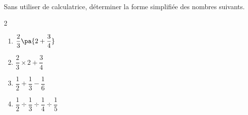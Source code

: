\begin{exo}{}
	Sans utiliser de calculatrice, déterminer la forme simplifiée des nombres suivants.
	\vspace*{-2mm}\begin{multicols}{2}
	\begin{enumerate}[itemsep=2mm]
		\item $\dfrac{2}{3}\pa{2 + \dfrac{3}{4}}$
		\item $\dfrac{2}{3} \times 2 + \dfrac{3}{4}$
		\item $\dfrac{1}{2} + \dfrac{1}{3} - \dfrac{1}{6}$
		\item $\dfrac{1}{2} \div \dfrac{1}{3} \div \dfrac{1}{4} \div \dfrac{1}{5}$
	\end{enumerate}
	\end{multicols}\vspace*{-2mm}
\end{exo}
